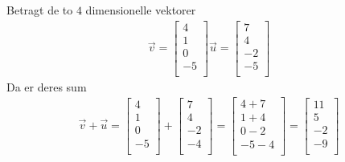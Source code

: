 \begin{eks}
Betragt de to $4$ dimensionelle vektorer
\begin{align*}
\vec{v}=
\begin{bmatrix}
4\\
1\\
0\\
-5\\
\end{bmatrix}
\vec{u}=
\begin{bmatrix}
7\\
4\\
-2\\
-5\\
\end{bmatrix}
\end{align*}
Da er deres sum 
\begin{align*}
\vec{v}+\vec{u}=
\begin{bmatrix}
4\\
1\\
0\\
-5\\
\end{bmatrix}
+
\begin{bmatrix}
7\\
4\\
-2\\
-4\\
\end{bmatrix}
=
\begin{bmatrix}
4+7\\
1+4\\
0-2\\
-5-4\\
\end{bmatrix}
=
\begin{bmatrix}
11\\
5\\
-2\\
-9\\
\end{bmatrix}
\end{align*}
\end{eks}


